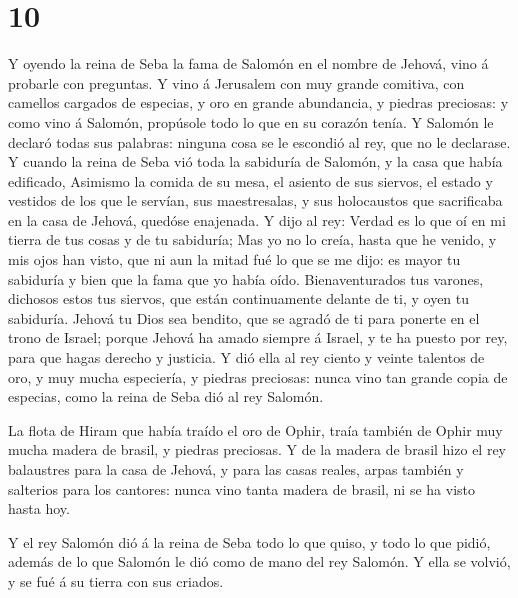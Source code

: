 \hypertarget{section-9}{%
\section{10}\label{section-9}}

 Y oyendo la reina de Seba la fama de Salomón en el nombre
de Jehová, vino á probarle con preguntas.  Y vino á
Jerusalem con muy grande comitiva, con camellos cargados de especias, y
oro en grande abundancia, y piedras preciosas: y como vino á Salomón,
propúsole todo lo que en su corazón tenía.  Y Salomón le
declaró todas sus palabras: ninguna cosa se le escondió al rey, que no
le declarase.  Y cuando la reina de Seba vió toda la
sabiduría de Salomón, y la casa que había edificado, 
Asimismo la comida de su mesa, el asiento de sus siervos, el estado y
vestidos de los que le servían, sus maestresalas, y sus holocaustos que
sacrificaba en la casa de Jehová, quedóse enajenada.  Y dijo
al rey: Verdad es lo que oí en mi tierra de tus cosas y de tu sabiduría;
 Mas yo no lo creía, hasta que he venido, y mis ojos han
visto, que ni aun la mitad fué lo que se me dijo: es mayor tu sabiduría
y bien que la fama que yo había oído.  Bienaventurados tus
varones, dichosos estos tus siervos, que están continuamente delante de
ti, y oyen tu sabiduría.  Jehová tu Dios sea bendito, que se
agradó de ti para ponerte en el trono de Israel; porque Jehová ha amado
siempre á Israel, y te ha puesto por rey, para que hagas derecho y
justicia.  Y dió ella al rey ciento y veinte talentos de
oro, y muy mucha especiería, y piedras preciosas: nunca vino tan grande
copia de especias, como la reina de Seba dió al rey Salomón.

 La flota de Hiram que había traído el oro de Ophir, traía
también de Ophir muy mucha madera de brasil, y piedras preciosas.
 Y de la madera de brasil hizo el rey balaustres para la
casa de Jehová, y para las casas reales, arpas también y salterios para
los cantores: nunca vino tanta madera de brasil, ni se ha visto hasta
hoy.

 Y el rey Salomón dió á la reina de Seba todo lo que quiso,
y todo lo que pidió, además de lo que Salomón le dió como de mano del
rey Salomón. Y ella se volvió, y se fué á su tierra con sus criados.

